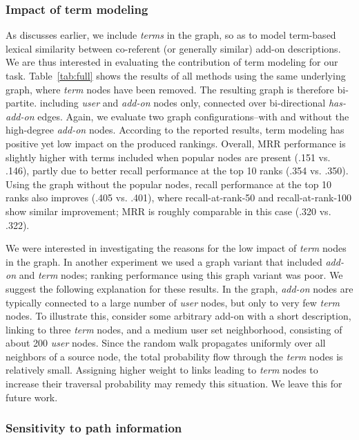 \documentclass[11pt,oneside]{book}
\let\Oldsubsubsection\subsubsection
\renewcommand{\subsubsection}{\FloatBarrier\Oldsubsubsection}
\begin{document}
\subsubsection{Impact of term modeling}

As discusses earlier, we include {\it terms} in the graph, so as to model term-based lexical similarity between co-referent (or generally similar) add-on descriptions. We are thus interested in evaluating the contribution of term modeling for our task.
Table~\ref{tab:full} shows the results of all methods using the same underlying graph, where {\it term} nodes have been removed. The resulting graph is therefore bi-partite. including {\it user} and {\it add-on} nodes only, connected over bi-directional {\it has-add-on} edges. Again, we evaluate two graph configurations--with and without the high-degree {\it add-on} nodes. According to the reported results, term modeling has positive yet low impact on the produced rankings. Overall, MRR performance is slightly higher with terms included when popular nodes are present (.151 vs. .146), partly due to better recall  performance at the top 10 ranks (.354 vs. .350). Using the graph without the popular nodes, recall performance at the top 10 ranks also improves (.405 vs. .401), where recall-at-rank-50 and recall-at-rank-100 show similar improvement; MRR is roughly comparable in this case (.320 vs. .322). 

We were interested in investigating the reasons for the low impact of {\it term} nodes in the graph. In another experiment we used a graph variant that included {\it add-on} and {\it term} nodes; ranking performance using this graph variant was poor. We suggest the following explanation for these results. In the graph, {\it add-on} nodes are typically connected to a large number of {\it user} nodes, but only to very few {\it term} nodes. To illustrate this, consider some arbitrary add-on with a short description, linking to three {\it term} nodes, and a medium user set neighborhood, consisting of about 200 {\it user} nodes. Since the random walk propagates uniformly over all neighbors of a source node, the total probability flow through the {\it term} nodes is relatively small. Assigning higher weight to links leading to {\it term} nodes to increase their traversal probability may remedy this situation. We leave this for future work.

\subsubsection{Sensitivity to path information}
\end{document}

